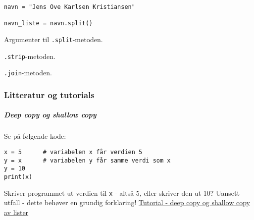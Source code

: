 \documentclass[]{article}
\let\oldsubparagraph\subparagraph
\renewcommand{\subparagraph}[1]{\oldsubparagraph{#1}\mbox{}}
\begin{document}
\begin{verbatim}
navn = "Jens Ove Karlsen Kristiansen"

navn_liste = navn.split()
\end{verbatim}

Argumenter til \texttt{.split}-metoden.

\texttt{.strip}-metoden.

\texttt{.join}-metoden.

\subsubsection{Litteratur og tutorials}\label{litteratur-og-tutorials}

\subparagraph{Deep copy og shallow
copy}\label{deep-copy-og-shallow-copy}

Se på følgende kode:

\begin{verbatim}
x = 5      # variabelen x får verdien 5
y = x      # variabelen y får samme verdi som x
y = 10
print(x)
\end{verbatim}

Skriver programmet ut verdien til \texttt{x} - altså 5, eller skriver
den ut 10? Uansett utfall - dette behøver en grundig forklaring!
\href{https://www.python-course.eu/python3_deep_copy.php}{Tutorial -
deep copy og shallow copy av lister}
\end{document}
